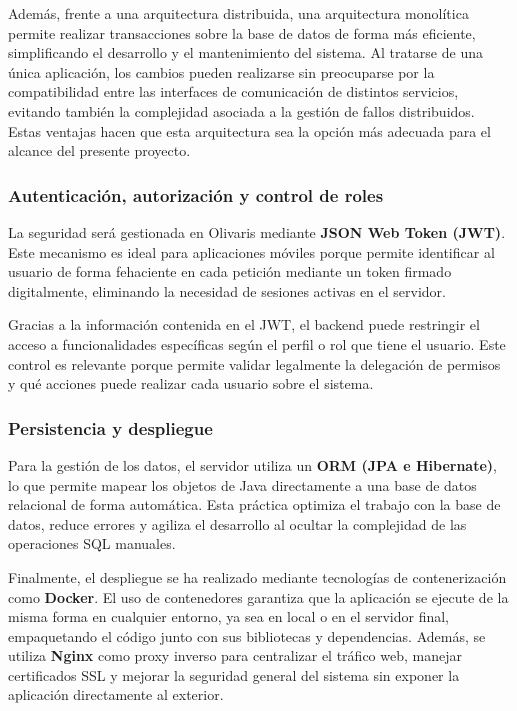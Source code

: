 Además, frente a una arquitectura distribuida, una arquitectura monolítica permite realizar transacciones sobre la base de datos de forma más eficiente, simplificando
el desarrollo y el mantenimiento del sistema. Al tratarse de una única aplicación, los cambios pueden realizarse sin preocuparse por la compatibilidad entre las 
interfaces de comunicación de distintos servicios, evitando también la complejidad asociada a la gestión de fallos distribuidos. Estas ventajas hacen que esta 
arquitectura sea la opción más adecuada para el alcance del presente proyecto.

\subsubsection{Autenticación, autorización y control de roles}

La seguridad será gestionada en Olivaris mediante \textbf{JSON Web Token (JWT)}. Este mecanismo es ideal para aplicaciones móviles porque permite identificar al 
usuario de forma fehaciente en cada petición mediante un token firmado digitalmente, eliminando la necesidad de sesiones activas en el servidor.

Gracias a la información contenida en el JWT, el backend puede restringir el acceso a funcionalidades específicas según el perfil o rol que tiene el usuario. Este 
control es relevante porque permite validar legalmente la delegación de permisos y qué acciones puede realizar cada usuario sobre el sistema.

\subsubsection{Persistencia y despliegue}

Para la gestión de los datos, el servidor utiliza un \textbf{ORM (JPA e Hibernate)}, lo que permite mapear los objetos de Java directamente a una base de datos 
relacional de forma automática. Esta práctica optimiza el trabajo con la base de datos, reduce errores y agiliza el desarrollo al ocultar la complejidad de las 
operaciones SQL manuales.

Finalmente, el despliegue se ha realizado mediante tecnologías de contenerización como \textbf{Docker}. El uso de contenedores garantiza que la aplicación se ejecute 
de la misma forma en cualquier entorno, ya sea en local o en el servidor final, empaquetando el código junto con sus bibliotecas y dependencias. Además, se utiliza \textbf{Nginx} 
como proxy inverso para centralizar el tráfico web, manejar certificados SSL y mejorar la seguridad general del sistema sin exponer la aplicación directamente al exterior.


